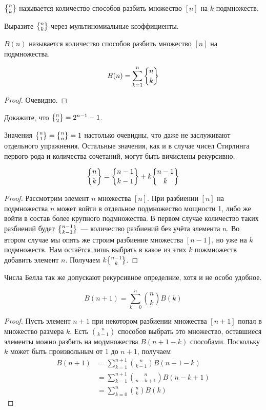 \begin{definition}
 $\sstirling{n}{k}$ называется количество способов разбить множество $[n]$ на $k$ подмножеств.
\end{definition}

\begin{exercise}
Выразите $\sstirling{n}{k}$ через мультиномиальные коэффициенты.
\end{exercise}

\begin{definition}
 $B(n)$ называется количество способов разбить множество $[n]$ на подмножества.
\end{definition}

\begin{thm}
$$B(n) = \sum_{k=1}^n\sstirling{n}{k}$$
\end{thm}
\begin{proof}
Очевидно.
\end{proof}

\begin{exercise}
Докажите, что $\sstirling{n}{2} = 2^{n-1} - 1$.
\end{exercise}

Значения $\sstirling{n}{1} = \sstirling{n}{n} = 1$ настолько очевидны, что даже не заслуживают отдельного упражнения. Остальные значения, как и в случае чисел Стирлинга первого рода и количества сочетаний, могут быть вичислены рекурсивно.

\begin{thm}
$$\sstirling{n}{k} = \sstirling{n-1}{k-1} + k\sstirling{n-1}{k}$$
\end{thm}
\begin{proof}
Рассмотрим элемент $n$ множества $[n]$. При разбиении $[n]$ на подмножества $n$ может войти в отдельное подмножество мощности 1, либо же войти в состав более крупного подмножества. В первом случае количество таких разбиений будет $\sstirling{n-1}{k-1}$~--- количество разбиений без учёта элемента $n$. Во втором случае мы опять же строим разбиение множества $[n-1]$, но уже на $k$ подмножеств. Нам остаётся лишь выбрать в какое из этих $k$ пожмножеств добавить элемент $n$. Получаем $k\sstirling{n-1}{k}$.
\end{proof}

Числа Белла так же допускают рекурсивное определние, хотя и не особо удобное.

\begin{thm}
$$B(n+1) = \sum_{k=0}^n{n \choose k} B(k)$$
\end{thm}
\begin{proof}
Пусть элемент $n+1$ при некотором разбиении множества $[n+1]$ попал в множество размера $k$. Есть $n\choose k - 1$ способов выбрать это множество, оставшиеся элементы можно разбить на модмножества $B(n+1-k)$ способами. Поскольку $k$ может быть произвольным от 1 до $n+1$, получаем
\begin{align*}
B(n+1) & = \sum_{k=1}^{n+1}{n\choose k-1}B(n+1-k)\\
& = \sum_{k=1}^{n+1}{n\choose n-k+1}B(n-k+1) \\
& = \sum_{k=0}^{n}{n\choose k}B(k)
\end{align*}
\end{proof}

